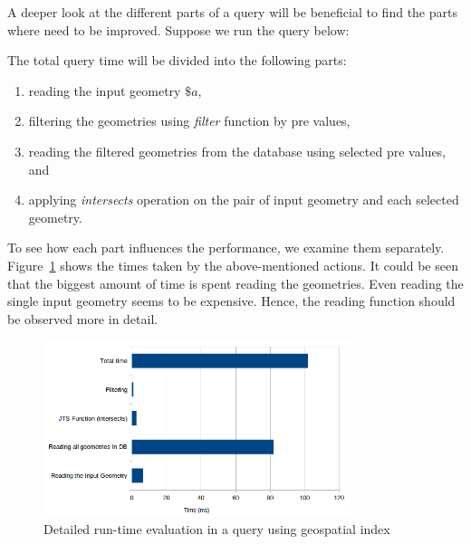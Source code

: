 \documentclass[a4paper,12pt]{article}
\begin{document}
A deeper look at the different parts of a query will be beneficial to find the parts where need to be improved. Suppose we run the query below:
\vspace{10px}
\vspace{10px}
The total query time will be divided into the following parts:

\begin{enumerate}
\item reading the input geometry $\$a$,
\item filtering the geometries using \textit{filter} function by pre values,
\item reading the filtered geometries from the database using selected pre values, and
\item applying \textit{intersects} operation on the pair of input geometry and each selected geometry.
\end{enumerate}

To see how each part influences the performance, we examine them separately. Figure~\ref{figDetailedTiming} shows the times taken by the above-mentioned actions. It could be seen that the biggest amount of time is spent reading the geometries. Even reading the single input geometry seems to be expensive. Hence, the reading function should be observed more in detail.

\begin{figure}
\centering
\includegraphics[width=0.8\textwidth]{detailedTiming}
\caption{Detailed run-time evaluation in a query using geospatial index}
\label{figDetailedTiming}
\end{figure}
\end{document}
